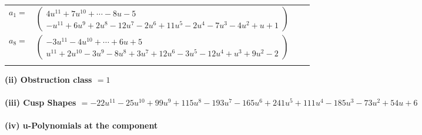 \documentclass[1p]{elsarticle_modified}
\theoremstyle{definition}
\begin{document}
\begin{tabular}{m{7pt} m{180pt} m{7pt} m{180pt} }
\flushright $a_{1}=$&$\begin{pmatrix}4 u^{11}+7 u^{10}+\cdots-8 u-5\\- u^{11}+6 u^9+2 u^8-12 u^7-2 u^6+11 u^5-2 u^4-7 u^3-4 u^2+u+1\end{pmatrix}$ \\
\flushright $a_{8}=$&$\begin{pmatrix}-3 u^{11}-4 u^{10}+\cdots+6 u+5\\u^{11}+2 u^{10}-3 u^9-8 u^8+3 u^7+12 u^6-3 u^5-12 u^4+u^3+9 u^2-2\end{pmatrix}$\\&\end{tabular}
\flushleft \textbf{(ii) Obstruction class $= 1$}\\~\\
\flushleft \textbf{(iii) Cusp Shapes $= -22 u^{11}-25 u^{10}+99 u^9+115 u^8-193 u^7-165 u^6+241 u^5+111 u^4-185 u^3-73 u^2+54 u+6$}\\~\\
\newpage\renewcommand{\arraystretch}{1}
\flushleft \textbf{(iv) u-Polynomials at the component}\newline \\
\end{document}
